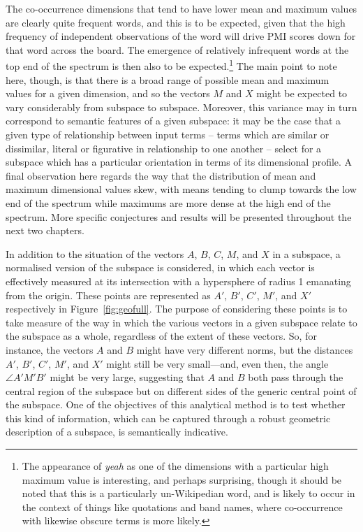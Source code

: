 The co-occurrence dimensions that tend to have lower mean and maximum values are clearly quite frequent words, and this is to be expected, given that the high frequency of independent observations of the word will drive PMI scores down for that word across the board.  The emergence of relatively infrequent words at the top end of the spectrum is then also to be expected.\footnote{The appearance of \emph{yeah} as one of the dimensions with a particular high maximum value is interesting, and perhaps surprising, though it should be noted that this is a particularly un-Wikipedian word, and is likely to occur in the context of things like quotations and band names, where co-occurrence with likewise obscure terms is more likely.}  The main point to note here, though, is that there is a broad range of possible mean and maximum values for a given dimension, and so the vectors $M$ and $X$ might be expected to vary considerably from subspace to subspace.  Moreover, this variance may in turn correspond to semantic features of a given subspace: it may be the case that a given type of relationship between input terms -- terms which are similar or dissimilar, literal or figurative in relationship to one another -- select for a subspace which has a particular orientation in terms of its dimensional profile.  A final observation here regards the way that the distribution of mean and maximum dimensional values skew, with means tending to clump towards the low end of the spectrum while maximums are more dense at the high end of the spectrum.  More specific conjectures and results will be presented throughout the next two chapters.

In addition to the situation of the vectors $A$, $B$, $C$, $M$, and $X$ in a subspace, a normalised version of the subspace is considered, in which each vector is effectively measured at its intersection with a hypersphere of radius 1 emanating from the origin.  These points are represented as $A'$, $B'$, $C'$, $M'$, and $X'$ respectively in Figure~\ref{fig:geofull}.  The purpose of considering these points is to take measure of the way in which the various vectors in a given subspace relate to the subspace as a whole, regardless of the extent of these vectors.  So, for instance, the vectors $A$ and $B$ might have very different norms, but the distances $A'$, $B'$, $C'$, $M'$, and $X'$ might still be very small---and, even then, the angle $\angle A'M'B'$ might be very large, suggesting that $A$ and $B$ both pass through the central region of the subspace but on different sides of the generic central point of the subspace.  One of the objectives of this analytical method is to test whether this kind of information, which can be captured through a robust geometric description of a subspace, is semantically indicative.

